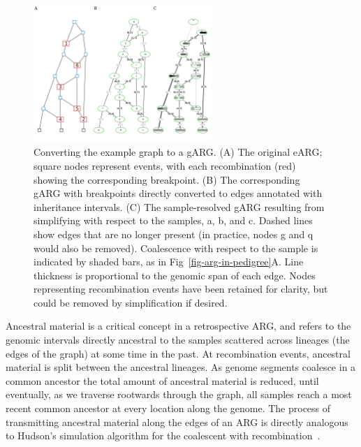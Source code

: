 \documentclass{article}
\newcommand{\noderef}[1]{\textsf{#1}}
\begin{document}
\begin{figure}
\centering
\includegraphics[width=0.6\textwidth]{illustrations/ancestry-resolution}
\caption{\label{fig-ancestry-resolution}
Converting the \citet[][Fig.~1]{wiuf1999recombination} example graph
to a gARG. (A) The original eARG; square nodes represent events, with
each recombination (red) showing the corresponding breakpoint.
(B) The corresponding gARG with breakpoints directly converted to
edges annotated with inheritance intervals.
(C) The sample-resolved gARG resulting from simplifying with respect
to the samples, \noderef{a}, \noderef{b}, and \noderef{c}.
Dashed lines show edges that are
no longer present (in practice, nodes \noderef{g} and \noderef{q} would also be removed).
Coalescence with respect to the sample is indicated by shaded bars, as
in Fig~\ref{fig-arg-in-pedigree}A.
Line thickness is proportional to the genomic span of each edge.
Nodes representing recombination events have been retained
for clarity, but could be removed by simplification if
desired.
}
\end{figure}

Ancestral material is a critical concept in a retrospective ARG,
and refers to the genomic intervals directly ancestral to the samples
scattered across lineages (the edges of the graph)
at some time in the past. At recombination
events, ancestral material is split between the ancestral lineages.
As genome segments coalesce in a common
ancestor the total amount of ancestral material is reduced, until
eventually, as we traverse rootwards through the graph, all
samples reach a most recent common ancestor at every location
along the genome. The process of transmitting ancestral material
along the edges of an ARG is directly analogous to Hudson's
simulation algorithm for the coalescent with
recombination~\citep{hudson1983testing,kelleher2016efficient}.
\end{document}
